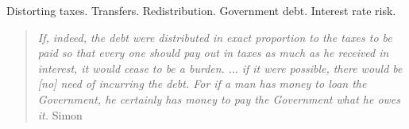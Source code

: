 \documentclass[thmsb,11pt]{article}
\begin{document}
%

\bigskip
{}Distorting taxes. Transfers. Redistribution.  Government debt.  Interest rate risk.
\thispagestyle{empty}\bigskip

\bigskip \newpage

\setcounter{page}{1}

\bigskip \baselineskip0.65cm


%




\begin{quote}
\emph{If, indeed, the debt were distributed in exact proportion to the taxes
to be paid so that every one should pay out in taxes as much as he received
in interest, it would cease to be a burden.%
$\ldots$ if it were possible, there
would be [no] need of incurring the debt. For if a man has money to loan the
Government, he certainly has money to pay the Government what he owes it.
}Simon \citet[p.85]{newcomb1865critical}
\end{quote}
\end{document}
